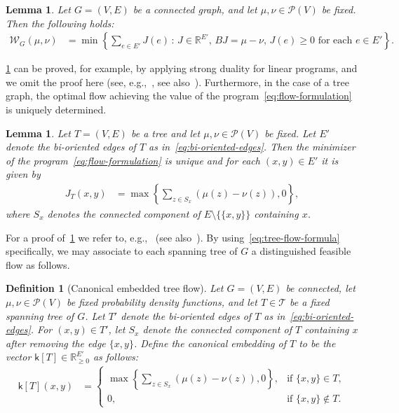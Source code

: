 \documentclass[11pt,a4paper]{article}
\newcommand{\prob}{{\mathscr{P}}}
\newcommand{\wass}{{\mathcal{W}}}
\newcommand{\setoftrees}{{\mathcal{T}}}
\newcommand{\embedding}{{\mathsf{k}}}
\newtheorem{definition}[theorem]{Definition}
\newtheorem{lemma}[theorem]{Lemma}
\begin{document}
    \begin{lemma}\label{lem:flow-formulation}
        Let $G=(V,E)$ be a connected graph, and let $\mu,\nu\in\prob(V)$ be fixed. Then the following holds:
            \begin{align}\label{eq:flow-formulation}
                \wass_G(\mu,\nu) &= \min\left\{\sum_{e\in E'} J(e) \,:\, J\in\mathbb{R}^{E'},\, BJ = \mu-\nu,\, J(e)\ge 0\text{ for each }e\in E'\right\}.
            \end{align}
    \end{lemma}

    \cref{lem:flow-formulation} can be proved, for example, by applying strong duality for linear programs, and we omit the proof here (see, e.g.,~\cite[Ch. 6]{peyre2019computational}, see also~\cite{essid2018quadratically}). Furthermore, in the case of a tree graph, the optimal flow achieving the value of the program~\cref{eq:flow-formulation} is uniquely determined. 

    \begin{lemma}\label{lem:transport-on-trees-formula}
        Let $T=(V,E)$ be a tree and let $\mu,\nu\in\prob(V)$ be fixed. Let $E'$ denote the bi-oriented edges of $T$ as in~\cref{eq:bi-oriented-edges}. Then the minimizer of the program~\cref{eq:flow-formulation} is unique and for each $(x,y)\in E'$ it is given by
            \begin{align}\label{eq:tree-flow-formula}
                J_T(x,y) &= \max\left\{\sum_{z\in S_x}(\mu(z)-\nu(z)),0\right\},
            \end{align}
        where $S_x$ denotes the connected component of $E\setminus\{\{x,y\}\}$ containing $x$.
    \end{lemma}

    For a proof of~\cref{lem:transport-on-trees-formula} we refer to, e.g.,~\cite{bapat1997moore} (see also~\cite{robertson2024all}). By using~\cref{eq:tree-flow-formula} specifically, we may associate to each spanning tree of $G$ a distinguished feasible flow as follows.

    \begin{definition}[Canonical embedded tree flow]\label{def:canonical-embedding}
        Let $G=(V,E)$ be connected, let $\mu,\nu\in\prob(V)$ be fixed probability density functions, and let $T\in\setoftrees$ be a fixed spanning tree of $G$. Let $T'$ denote the bi-oriented edges of $T$ as in~\cref{eq:bi-oriented-edges}. For $(x,y)\in T'$, let $S_x$ denote the connected component of $T$ containing $x$ after removing the edge $\{x,y\}$. Define the \emph{canonical embedding} of $T$ to be the vector $\embedding[T]\in \mathbb{R}_{\ge 0}^{E'}$ as follows:
            \begin{align}\label{eq:canonical-embedding}
                \embedding[T](x,y) &= \begin{cases}
                    \max\left\{\sum_{z\in S_x} (\mu(z)-\nu(z)), 0\right\}, & \text{if } \{x,y\}\in T,\\
                    0, & \text{if } \{x,y\}\notin T.
                \end{cases}
            \end{align}
    \end{definition}
\end{document}
